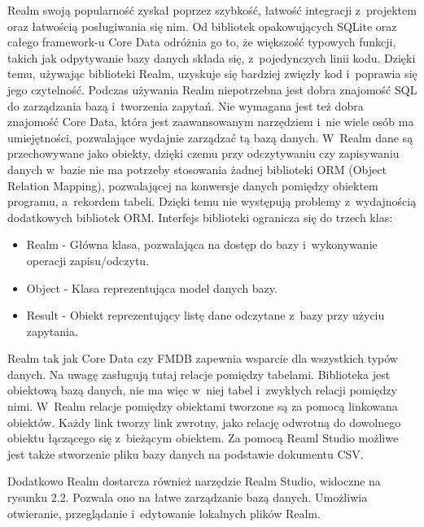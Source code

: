 Realm swoją popularność zyskał poprzez szybkość, łatwość integracji z~projektem oraz łatwością posługiwania się nim. Od bibliotek opakowujących SQLite oraz całego framework-u Core Data odróżnia go to, że większość typowych funkcji, takich jak odpytywanie bazy danych składa się, z~pojedynczych linii kodu. Dzięki temu, używając biblioteki Realm, uzyskuje się bardziej zwięzły kod i~poprawia się jego czytelność. Podczas używania Realm niepotrzebna jest dobra znajomość SQL do zarządzania bazą i~tworzenia zapytań. Nie wymagana jest też dobra znajomość Core Data, która jest zaawansowanym narzędziem i~nie wiele osób ma umiejętności, pozwalające wydajnie zarządzać tą bazą danych. W~Realm dane są przechowywane jako obiekty, dzięki czemu przy odczytywaniu czy zapisywaniu danych w~bazie nie ma potrzeby stosowania żadnej biblioteki ORM (Object Relation Mapping), pozwalającej na konwersje danych pomiędzy obiektem programu, a~rekordem tabeli. Dzięki temu nie występują problemy z~wydajnością dodatkowych bibliotek ORM. Interfejs biblioteki ogranicza się do trzech klas: 

\begin{itemize}
	\item Realm -  Główna klasa, pozwalająca na dostęp do bazy i~wykonywanie operacji zapisu/odczytu.
	\item Object - Klasa reprezentująca model danych bazy.
	\item Result - Obiekt reprezentujący listę dane odczytane z~bazy przy użyciu zapytania.
\end{itemize}
 \par

Realm tak jak Core Data czy FMDB zapewnia wsparcie dla wszystkich typów danych. Na uwagę zasługują tutaj relacje pomiędzy tabelami. Biblioteka jest obiektową bazą danych, nie ma więc w~niej tabel i~zwykłych relacji pomiędzy nimi. W~Realm relacje pomiędzy obiektami tworzone są za pomocą linkowana obiektów. Każdy link tworzy link zwrotny, jako relację odwrotną do dowolnego obiektu łączącego się z~bieżącym obiektem. Za pomocą Reaml Studio możliwe jest także stworzenie pliku bazy danych na podstawie dokumentu CSV.  \par 

Dodatkowo Realm dostarcza również narzędzie Realm Studio, widoczne na rysunku 2.2. Pozwala ono na łatwe zarządzanie bazą danych. Umożliwia otwieranie, przeglądanie i~edytowanie lokalnych plików Realm.  

